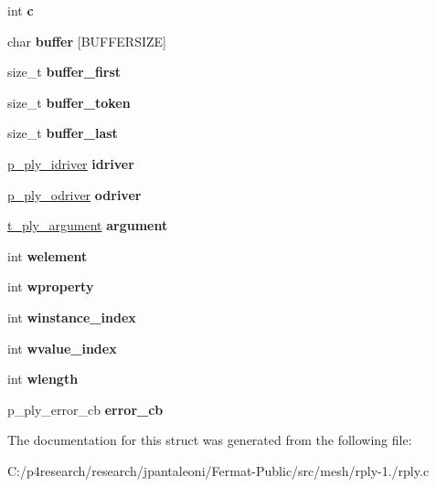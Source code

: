 \begin{DoxyCompactItemize}
int {\bfseries c}
\item 
\mbox{\label{structt__ply___a6376859fab52fad26ba46db78c90a9bb}} 
char {\bfseries buffer} \mbox{[}B\+U\+F\+F\+E\+R\+S\+I\+ZE\mbox{]}
\item 
\mbox{\label{structt__ply___a09f60faf79c174f9ec79599a0b77e790}} 
size\+\_\+t {\bfseries buffer\+\_\+first}
\item 
\mbox{\label{structt__ply___a15e8ece9572100ce5213e8b221bf6057}} 
size\+\_\+t {\bfseries buffer\+\_\+token}
\item 
\mbox{\label{structt__ply___a1ae894dcae5850948a9855d9e449baec}} 
size\+\_\+t {\bfseries buffer\+\_\+last}
\item 
\mbox{\label{structt__ply___aecaa80a70a03721553ebeab9fe9a22e0}} 
\hyperlink{structt__ply__idriver__}{p\+\_\+ply\+\_\+idriver} {\bfseries idriver}
\item 
\mbox{\label{structt__ply___ab76942a651062d0747637e8df5632e24}} 
\hyperlink{structt__ply__odriver__}{p\+\_\+ply\+\_\+odriver} {\bfseries odriver}
\item 
\mbox{\label{structt__ply___affbe7e3e937f7f039f496d8a57b16904}} 
\hyperlink{structt__ply__argument__}{t\+\_\+ply\+\_\+argument} {\bfseries argument}
\item 
\mbox{\label{structt__ply___aecec2e9e109f933168ec778151befa70}} 
int {\bfseries welement}
\item 
\mbox{\label{structt__ply___af8f0c45987aade203a7679adea2bac3b}} 
int {\bfseries wproperty}
\item 
\mbox{\label{structt__ply___a8847bc6539c3d8f0e59e1e6d9f6f80cb}} 
int {\bfseries winstance\+\_\+index}
\item 
\mbox{\label{structt__ply___a576ee4ec7e42a74b71f7c723296e9316}} 
int {\bfseries wvalue\+\_\+index}
\item 
\mbox{\label{structt__ply___a6d64aacfb09491e7f0ae16f10be57bf1}} 
int {\bfseries wlength}
\item 
\mbox{\label{structt__ply___a3f9870cbe445137d16da2173363bc810}} 
p\+\_\+ply\+\_\+error\+\_\+cb {\bfseries error\+\_\+cb}
\end{DoxyCompactItemize}


The documentation for this struct was generated from the following file\+:\begin{DoxyCompactItemize}
\item 
C\+:/p4research/research/jpantaleoni/\+Fermat-\/\+Public/src/mesh/rply-\/1./rply.\+c\end{DoxyCompactItemize}
